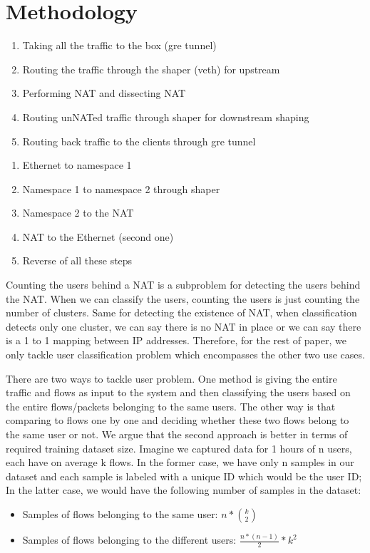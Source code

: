 \section{Methodology}
\begin{enumerate}
    \item Taking all the traffic to the box (gre tunnel)
    \item Routing the traffic through the shaper (veth) for upstream
    \item Performing NAT and dissecting NAT
    \item Routing unNATed traffic through shaper for downstream shaping
    \item Routing back traffic to the clients through gre tunnel 
\end{enumerate}

\begin{enumerate}
    \item Ethernet to namespace 1 
    \item Namespace 1 to namespace 2 through shaper
    \item Namespace 2 to the NAT 
    \item NAT to the Ethernet (second one)
    \item Reverse of all these steps
\end{enumerate}

Counting the users behind a NAT is a subproblem for detecting the users behind the NAT. When we can classify the users, counting the users is just counting the number of clusters. Same for detecting the existence of NAT, when classification detects only one cluster, we can say there is no NAT in place or we can say there is a 1 to 1 mapping between IP addresses. Therefore, for the rest of paper, we only tackle user classification problem which encompasses the other two use cases. 

There are two ways to tackle user problem. One method is giving the entire traffic and flows as input to the system and then classifying the users based on the entire flows/packets belonging to the same users. The other way is that comparing to flows one by one and deciding whether these two flows belong to the same user or not. We argue that the second approach is better in terms of required training dataset size. Imagine we captured data for 1 hours of n users, each have on average k flows. In the former case, we have only n samples in our dataset and each sample is labeled with a unique ID which would be the user ID; In the latter case, we would have the following number of samples in the dataset:
\begin{itemize}
    \item Samples of flows belonging to the same user: $n * {k \choose 2}$
    \item Samples of flows belonging to the different users: $\frac{n*(n-1)}{2} * k^2 $
\end{itemize}

